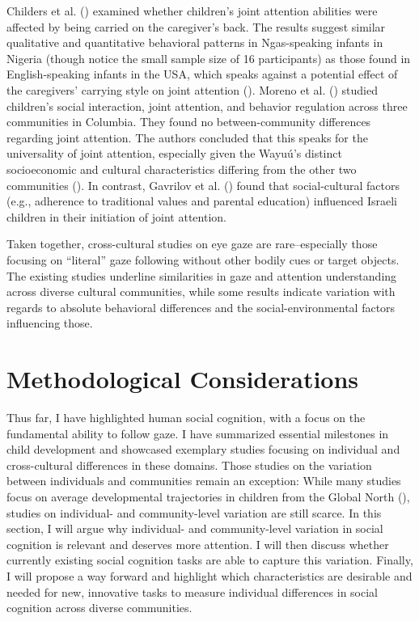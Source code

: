 \documentclass[
]{scrbook}
\begin{document}
Childers et al. () examined whether children's joint attention abilities were affected by being carried on the caregiver's back. The results suggest similar qualitative and quantitative behavioral patterns in Ngas-speaking infants in Nigeria (though notice the small sample size of 16 participants) as those found in English-speaking infants in the USA, which speaks against a potential effect of the caregivers' carrying style on joint attention (). Moreno et al. () studied children's social interaction, joint attention, and behavior regulation across three communities in Columbia. They found no between-community differences regarding joint attention. The authors concluded that this speaks for the universality of joint attention, especially given the Wayuú's distinct socioeconomic and cultural characteristics differing from the other two communities (). In contrast, Gavrilov et al. () found that social-cultural factors (e.g., adherence to traditional values and parental education) influenced Israeli children in their initiation of joint attention.

Taken together, cross-cultural studies on eye gaze are rare\thinspace --\thinspace especially those focusing on ``literal'' gaze following without other bodily cues or target objects. The existing studies underline similarities in gaze and attention understanding across diverse cultural communities, while some results indicate variation with regards to absolute behavioral differences and the social-environmental factors influencing those.

\section{Methodological Considerations}\label{intro-methods}

Thus far, I have highlighted human social cognition, with a focus on the fundamental ability to follow gaze. I have summarized essential milestones in child development and showcased exemplary studies focusing on individual and cross-cultural differences in these domains. Those studies on the variation between individuals and communities remain an exception: While many studies focus on average developmental trajectories in children from the Global North (), studies on individual- and community-level variation are still scarce. In this section, I will argue why individual- and community-level variation in social cognition is relevant and deserves more attention. I will then discuss whether currently existing social cognition tasks are able to capture this variation. Finally, I will propose a way forward and highlight which characteristics are desirable and needed for new, innovative tasks to measure individual differences in social cognition across diverse communities.
\end{document}
